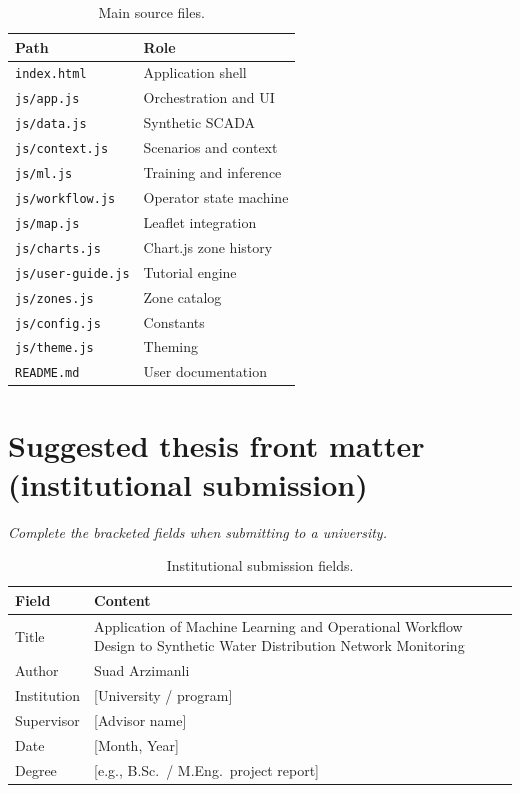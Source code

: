 \documentclass[12pt,a4paper]{article}
\begin{document}
\begin{table}[htbp]
\centering
\caption{Main source files.}
\begin{tabular}{@{}ll@{}}
\toprule
\textbf{Path} & \textbf{Role} \\
\midrule
\texttt{index.html} & Application shell \\
\texttt{js/app.js} & Orchestration and UI \\
\texttt{js/data.js} & Synthetic SCADA \\
\texttt{js/context.js} & Scenarios and context \\
\texttt{js/ml.js} & Training and inference \\
\texttt{js/workflow.js} & Operator state machine \\
\texttt{js/map.js} & Leaflet integration \\
\texttt{js/charts.js} & Chart.js zone history \\
\texttt{js/user-guide.js} & Tutorial engine \\
\texttt{js/zones.js} & Zone catalog \\
\texttt{js/config.js} & Constants \\
\texttt{js/theme.js} & Theming \\
\texttt{README.md} & User documentation \\
\bottomrule
\end{tabular}
\end{table}

\section{Suggested thesis front matter (institutional submission)}
\label{app:frontmatter}

\noindent\textit{Complete the bracketed fields when submitting to a university.}

\begin{table}[htbp]
\centering
\caption{Institutional submission fields.}
\begin{tabular}{@{}ll@{}}
\toprule
\textbf{Field} & \textbf{Content} \\
\midrule
Title & Application of Machine Learning and Operational Workflow Design to Synthetic Water Distribution Network Monitoring \\
Author & Suad Arzimanli \\
Institution & [University / program] \\
Supervisor & [Advisor name] \\
Date & [Month, Year] \\
Degree & [e.g., B.Sc.\ / M.Eng.\ project report] \\
\bottomrule
\end{tabular}
\end{table}
\end{document}
